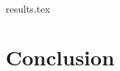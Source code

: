 \documentclass[a4paper,11pt,twoside]{report}
\begin{document}




{results.tex}





\chapter{Conclusion}


\end{document}
